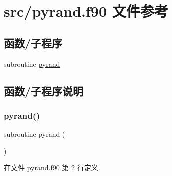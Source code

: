 \hypertarget{pyrand_8f90}{}\section{src/pyrand.f90 文件参考}
\label{pyrand_8f90}
\subsection*{函数/子程序}
\begin{DoxyCompactItemize}
\item 
subroutine \mbox{\hyperlink{pyrand_8f90_a2d74d5dd64881524212b3720af2696de}{pyrand}}
\end{DoxyCompactItemize}


\subsection{函数/子程序说明}
\mbox{\label{pyrand_8f90_a2d74d5dd64881524212b3720af2696de}} 
\subsubsection{\texorpdfstring{pyrand()}{pyrand()}}
{\footnotesize\ttfamily subroutine pyrand (\begin{DoxyParamCaption}{ }\end{DoxyParamCaption})}



在文件 pyrand.\+f90 第 2 行定义.

